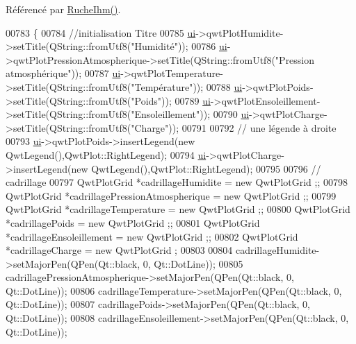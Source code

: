 Référencé par \hyperlink{class_ruche_ihm_a04c2544ba4e9cca6c38f553c32d63dee}{Ruche\+Ihm()}.


\begin{DoxyCode}
00783 \{
00784     \textcolor{comment}{//initialisation Titre}
00785     \hyperlink{class_ruche_ihm_a64786058bd7f88ca2f1e9743bb27c25b}{ui}->qwtPlotHumidite->setTitle(QString::fromUtf8(\textcolor{stringliteral}{"Humidité"}));
00786     \hyperlink{class_ruche_ihm_a64786058bd7f88ca2f1e9743bb27c25b}{ui}->qwtPlotPressionAtmospherique->setTitle(QString::fromUtf8(\textcolor{stringliteral}{"Pression atmosphérique"}));
00787     \hyperlink{class_ruche_ihm_a64786058bd7f88ca2f1e9743bb27c25b}{ui}->qwtPlotTemperature->setTitle(QString::fromUtf8(\textcolor{stringliteral}{"Température"}));
00788     \hyperlink{class_ruche_ihm_a64786058bd7f88ca2f1e9743bb27c25b}{ui}->qwtPlotPoids->setTitle(QString::fromUtf8(\textcolor{stringliteral}{"Poids"}));
00789     \hyperlink{class_ruche_ihm_a64786058bd7f88ca2f1e9743bb27c25b}{ui}->qwtPlotEnsoleillement->setTitle(QString::fromUtf8(\textcolor{stringliteral}{"Ensoleillement"}));
00790     \hyperlink{class_ruche_ihm_a64786058bd7f88ca2f1e9743bb27c25b}{ui}->qwtPlotCharge->setTitle(QString::fromUtf8(\textcolor{stringliteral}{"Charge"}));
00791 
00792     \textcolor{comment}{// une légende à droite}
00793     \hyperlink{class_ruche_ihm_a64786058bd7f88ca2f1e9743bb27c25b}{ui}->qwtPlotPoids->insertLegend(\textcolor{keyword}{new} QwtLegend(),QwtPlot::RightLegend);
00794     \hyperlink{class_ruche_ihm_a64786058bd7f88ca2f1e9743bb27c25b}{ui}->qwtPlotCharge->insertLegend(\textcolor{keyword}{new} QwtLegend(),QwtPlot::RightLegend);
00795 
00796     \textcolor{comment}{// cadrillage}
00797     QwtPlotGrid *cadrillageHumidite = \textcolor{keyword}{new} QwtPlotGrid ;;
00798     QwtPlotGrid *cadrillagePressionAtmospherique = \textcolor{keyword}{new} QwtPlotGrid ;;
00799     QwtPlotGrid *cadrillageTemperature = \textcolor{keyword}{new} QwtPlotGrid ;;
00800     QwtPlotGrid *cadrillagePoids = \textcolor{keyword}{new} QwtPlotGrid ;;
00801     QwtPlotGrid *cadrillageEnsoleillement = \textcolor{keyword}{new} QwtPlotGrid ;;
00802     QwtPlotGrid *cadrillageCharge = \textcolor{keyword}{new} QwtPlotGrid ;
00803 
00804     cadrillageHumidite->setMajorPen(QPen(Qt::black, 0, Qt::DotLine));
00805     cadrillagePressionAtmospherique->setMajorPen(QPen(Qt::black, 0, Qt::DotLine));
00806     cadrillageTemperature->setMajorPen(QPen(Qt::black, 0, Qt::DotLine));
00807     cadrillagePoids->setMajorPen(QPen(Qt::black, 0, Qt::DotLine));
00808     cadrillageEnsoleillement->setMajorPen(QPen(Qt::black, 0, Qt::DotLine));

\end{DoxyCode}

